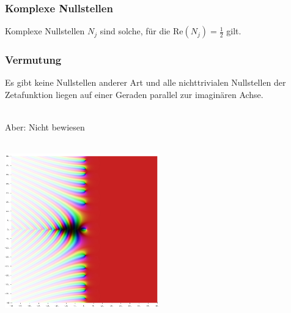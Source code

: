 \documentclass{article}
\begin{document}
\subsubsection{Komplexe Nullstellen}
Komplexe Nullstellen $N_j$ sind solche, für die $\textrm{Re}(N_j) = \frac{1}{2}$ gilt.

\subsubsection{Vermutung}
\begin{itshape}
Es gibt keine Nullstellen anderer Art und alle nichttrivialen Nullstellen der Zetafunktion liegen auf einer Geraden parallel zur imaginären Achse.
\end{itshape}
\\
Aber: Nicht bewiesen \\
\\
\begin{center}
\includegraphics[width=0.5\textwidth]{complex_zeta.jpg}
\end{center}
\end{document}

